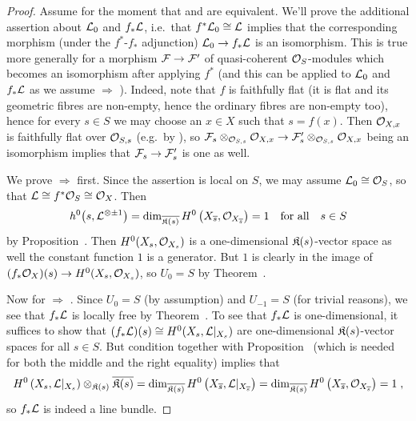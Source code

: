 \documentclass[a4paper,parskip=half,numbers=enddot, DIV=12]{scrreprt}
\begin{document}
\begin{proof}
	Assume for the moment that  and  are equivalent. We'll prove the additional assertion about $\mathcal{L}_0$ and $f_*\mathcal{L}$, i.e.\ that $f^*\mathcal{L}_0\cong \mathcal{L}$ implies that the corresponding morphism (under the $f^*$-$f_*$ adjunction) $\Ll_0\morphism f_*\Ll$ is an isomorphism. This is true more generally for a morphism $\Ff\morphism\Ff'$ of quasi-coherent $\mathcal{O}_S$-modules which becomes an isomorphism after applying $f^*$ (and this can be applied to $\mathcal{L}_0$ and $f_*\mathcal{L}$ as we assume  $\Rightarrow$ ). Indeed, note that $f$ is faithfully flat (it is flat and its geometric fibres are non-empty, hence the ordinary fibres are non-empty too), hence for every $s\in S$ we may choose an $x\in X$ such that $s=f(x)$. Then $\mathcal{O}_{X,x}$ is faithfully flat over $\mathcal{O}_{S,s}$ (e.g.\ by \cite[]{stacks-project}), so $\Ff_s\otimes_{\Oo_{S,s}}\Oo_{X,x}\morphism\Ff'_s\otimes_{\Oo_{S,s}}\Oo_{X,x}$ being an isomorphism implies that $\Ff_s \morphism\Ff'_s$ is one as well.
	
	We prove  $\Rightarrow$  first. Since the assertion is local on $S$, we may assume $\mathcal{L}_0\cong\mathcal{O}_S$, so that $\mathcal{L}\cong f^*\mathcal{O}_S\cong \mathcal{O}_X$. Then
	\begin{align*}
		h^0\big(s,\mathcal{L}^{\otimes \pm 1}\big)=\dim_{\overline{\mathfrak{K}(s)}}H^0\left(X_{\overline{s}},\mathcal{O}_{X_{\overline{s}}}\right)=1\quad\text{for all}\quad s\in S 
	\end{align*}
	by Proposition~. Then $H^0(X_s,\mathcal{O}_{X_s})$ is a one-dimensional $\mathfrak{K}(s)$-vector space as well the constant function $1$ is a generator. But $1$ is clearly in the image of $(f_*\Oo_X)(s)\morphism H^0(X_s,\Oo_{X_s})$, so $U_0=S$ by Theorem~.
	
	Now for  $\Rightarrow$ . Since $U_0=S$ (by assumption) and $U_{-1}=S$ (for trivial reasons), we see that $f_*\mathcal{L}$ is locally free by Theorem~. To see that $f_*\mathcal{L}$ is one-dimensional, it suffices to show that $(f_*\mathcal{L})(s)\cong H^0(X_s,\mathcal{L}|_{X_s})$ are one-dimensional $\mathfrak{K}(s)$-vector spaces for all $s\in S$. But condition  together with Proposition~ (which is needed for both the middle and the right equality) implies that 
	\begin{align*}
		H^0\left(X_s,\mathcal{L}|_{X_s}\right)\otimes_{\mathfrak{K}(s)}\overline{\mathfrak{K}(s)}= \dim_{\overline{\mathfrak{K}(s)}}H^0\left(X_{\overline{s}},\mathcal{L}|_{X_{\overline{s}}}\right)=\dim_{\overline{\mathfrak{K}(s)}}H^0\left(X_{\overline{s}},\mathcal{O}_{X_{\overline{s}}}\right)=1\;,
	\end{align*}
	so $f_*\mathcal{L}$ is indeed a line bundle. 
	

\end{proof}
\end{document}
